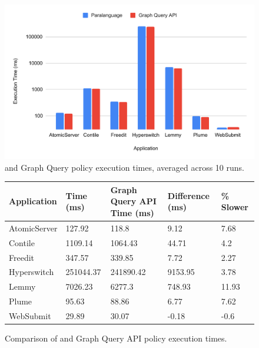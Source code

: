 \begin{figure}
    \begin{centering}
        \includegraphics[scale=0.6]{graphics/times.pdf}
        \caption{\syslang{} and Graph Query policy execution times, averaged across 10 runs.}
        \label{f:times}
    \end{centering}
\end{figure}
%
\begin{figure}
    \begin{tabular}{|l|p{3cm}|p{3.5cm}|p{2cm}|p{3cm}|}
        \hline
        \textbf{Application} & \textbf{\syslang{} Time (ms)} & \textbf{Graph Query API Time (ms)} & \textbf{Difference (ms)} & \textbf{\syslang{} \% Slower} \\ \hline
        AtomicServer & 127.92    & 118.8     & 9.12    & 7.68  \\ \hline
        Contile      & 1109.14   & 1064.43   & 44.71   & 4.2   \\ \hline
        Freedit      & 347.57    & 339.85    & 7.72    & 2.27  \\ \hline
        Hyperswitch  & 251044.37 & 241890.42 & 9153.95 & 3.78  \\ \hline
        Lemmy        & 7026.23   & 6277.3    & 748.93  & 11.93 \\ \hline
        Plume        & 95.63     & 88.86     & 6.77    & 7.62  \\ \hline
        WebSubmit    & 29.89     & 30.07     & -0.18   & -0.6  \\ \hline               
        \end{tabular}
        \caption{Comparison of \syslang{} and Graph Query API policy execution times.}
        \label{f:percentages}
\end{figure}

